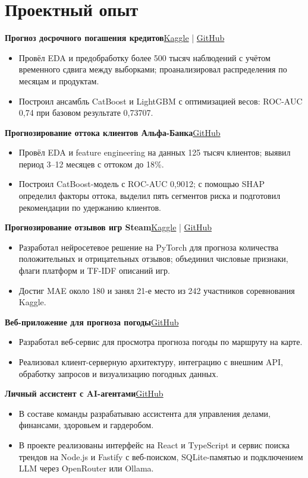 \documentclass[a4paper,11pt]{article}
\newcommand{\project}[2]{\vspace{6pt}\textbf{#1}\hfill #2\par}
\newcommand{\gh}[1]{\href{#1}{GitHub}}
\newcommand{\kg}[1]{\href{#1}{Kaggle}}
\begin{document}
\section*{Проектный опыт}
\project{Прогноз досрочного погашения кредитов}{\kg{https://www.kaggle.com/competitions/cu-2025-scoring} | \gh{https://github.com/baranczov/ML_Competition_1}}
\begin{itemize}
\item Провёл EDA и предобработку более 500 тысяч наблюдений с учётом временного сдвига между выборками; проанализировал распределения по месяцам и продуктам.
\item Построил ансамбль CatBoost и LightGBM с оптимизацией весов: ROC-AUC 0,74 при базовом результате 0,73707.
\end{itemize}
\project{Прогнозирование оттока клиентов Альфа-Банка}{\gh{https://github.com/baranczov/ML_Project_1}}
\begin{itemize}
\item Провёл EDA и feature engineering на данных 125 тысяч клиентов; выявил период 3--12 месяцев с оттоком до 18\%.
\item Построил CatBoost-модель с ROC-AUC 0,9012; с помощью SHAP определил факторы оттока, выделил пять сегментов риска и подготовил рекомендации по удержанию клиентов.
\end{itemize}
\project{Прогнозирование отзывов игр Steam}{\kg{https://www.kaggle.com/competitions/cu-advance-project/leaderboard?tab=public} | \gh{https://github.com/baranczov/ML_Competition_2}}
\begin{itemize}
\item Разработал нейросетевое решение на PyTorch для прогноза количества положительных и отрицательных отзывов; объединил числовые признаки, флаги платформ и TF-IDF описаний игр.
\item Достиг MAE около 180 и занял 21-е место из 242 участников соревнования Kaggle.
\end{itemize}
\project{Веб-приложение для прогноза погоды}{\gh{https://github.com/baranczov/SWE_weather_app}}
\begin{itemize}
\item Разработал веб-сервис для просмотра прогноза погоды по маршруту на карте.
\item Реализовал клиент-серверную архитектуру, интеграцию с внешним API, обработку запросов и визуализацию погодных данных.
\end{itemize}
\project{Личный ассистент с AI-агентами}{\gh{https://github.com/Assirisss/ai-agents-hse}}
\begin{itemize}
\item В составе команды разрабатываю ассистента для управления делами, финансами, здоровьем и гардеробом.
\item В проекте реализованы интерфейс на React и TypeScript и сервис поиска трендов на Node.js и Fastify с веб-поиском, SQLite-памятью и подключением LLM через OpenRouter или Ollama.
\end{itemize}
\end{document}
